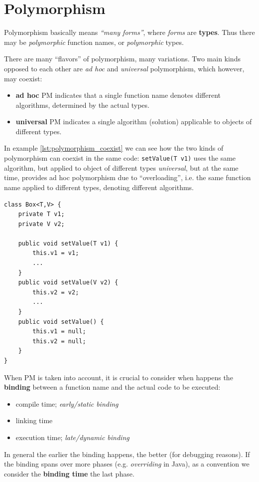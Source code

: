 \chapter{Polymorphism}
Polymorphism basically means \textit{``many forms''}, where \textit{forms} are \textbf{types}.
Thus there may be \textit{polymorphic} function names, or \textit{polymorphic} types.

\begin{paracol}{2}
    
    There are many ``flavors'' of polymorphism, many variations.
    Two main kinds opposed to each other are \textit{ad hoc} and \textit{universal} polymorphism, which however, may coexist:
    \begin{itemize}
        \item \textbf{ad hoc} PM indicates that a single function name denotes different algorithms, determined by the actual types.
        \item \textbf{universal} PM indicates a single algorithm (solution) applicable to objects of different types.
    \end{itemize}

    In example \ref{lst:polymorphism_coexist} we can see how the two kinds of polymorphism can coexist in the same code:
    \lstinline|setValue(T v1)| uses the same algorithm, but applied to object of different types \textit{universal}, but at the same time, provides ad hoc polymorphism due to ``overloading'', i.e. the same function name applied to different types, denoting different algorithms.

    \switchcolumn

    \begin{lstlisting}[label={lst:polymorphism_coexist},caption={Coexistence of ad hoc and universal polymorphism},captionpos=b]
class Box<T,V> {
    private T v1;
    private V v2;

    public void setValue(T v1) {
        this.v1 = v1;
        ...
    }
    public void setValue(V v2) {
        this.v2 = v2;
        ...
    }
    public void setValue() {
        this.v1 = null;
        this.v2 = null;
    }
}
    \end{lstlisting}
\end{paracol}


When PM is taken into account, it is crucial to consider when happens the \textbf{binding} between a function name and the actual code to be executed:
\begin{itemize}
    \item compile time; \textit{early/static binding}
    \item linking time
    \item execution time; \textit{late/dynamic binding}
\end{itemize}
In general the earlier the binding happens, the better (for debugging reasons).
If the binding spans over more phases (e.g. \textit{overriding} in Java), as a convention we consider the \textbf{binding time} the last phase.

